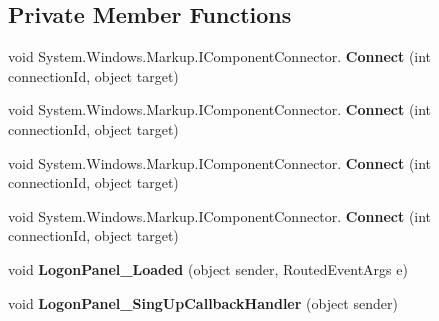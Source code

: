 \subsection*{Private Member Functions}
\begin{DoxyCompactItemize}
\item 
\mbox{\label{class_wpf_handler_1_1_u_i_1_1_controls_1_1_logon_1_1_logon_screen_a823deb2cd00da3e7fd7ae170c54f5d83}} 
void System.\+Windows.\+Markup.\+I\+Component\+Connector. {\bfseries Connect} (int connection\+Id, object target)
\item 
\mbox{\label{class_wpf_handler_1_1_u_i_1_1_controls_1_1_logon_1_1_logon_screen_a823deb2cd00da3e7fd7ae170c54f5d83}} 
void System.\+Windows.\+Markup.\+I\+Component\+Connector. {\bfseries Connect} (int connection\+Id, object target)
\item 
\mbox{\label{class_wpf_handler_1_1_u_i_1_1_controls_1_1_logon_1_1_logon_screen_a823deb2cd00da3e7fd7ae170c54f5d83}} 
void System.\+Windows.\+Markup.\+I\+Component\+Connector. {\bfseries Connect} (int connection\+Id, object target)
\item 
\mbox{\label{class_wpf_handler_1_1_u_i_1_1_controls_1_1_logon_1_1_logon_screen_a823deb2cd00da3e7fd7ae170c54f5d83}} 
void System.\+Windows.\+Markup.\+I\+Component\+Connector. {\bfseries Connect} (int connection\+Id, object target)
\item 
\mbox{\label{class_wpf_handler_1_1_u_i_1_1_controls_1_1_logon_1_1_logon_screen_a275dea16cf32b81cd2f75f19c92e5e4b}} 
void {\bfseries Logon\+Panel\+\_\+\+Loaded} (object sender, Routed\+Event\+Args e)
\item 
\mbox{\label{class_wpf_handler_1_1_u_i_1_1_controls_1_1_logon_1_1_logon_screen_a424adaef54eeeb3afb89f0c3c4b8ee90}} 
void {\bfseries Logon\+Panel\+\_\+\+Sing\+Up\+Callback\+Handler} (object sender)
\item 
\mbox{\label{class_wpf_handler_1_1_u_i_1_1_controls_1_1_logon_1_1_logon_screen_a59b3a2b822c5b5edae10467098a02efc}} 

\end{DoxyCompactItemize}
